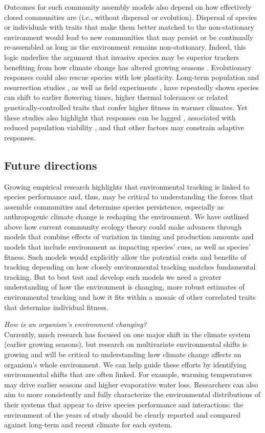\documentclass[11pt,letterpaper]{article}
\newcommand{\R}[1]{\label{#1}\linelabel{#1}}
\begin{document}
Outcomes for such community assembly models also depend on how effectively closed communities are  (i.e., without dispersal or evolution). Dispersal of species or individuals with traits that make them better matched to the non-stationary environment would lead to new communities that may persist or be continually re-assembled as long as the environment remains non-stationary. Indeed, this logic underlies the argument that invasive species may be superior trackers benefiting from how climate change has altered growing seasons \citep{Willis:2010al,wolkovich:2010fee}. Evolutionary responses could also rescue species with low plasticity. Long-term population \citep[e.g.,][]{colautti2017} and resurrection studies \citep{wilczek2014,yousey2018}, as well as field experiments \citep{colautti2017,arab2019}, have repeatedly shown species can shift to earlier flowering times, higher thermal tolerances or related genetically-controlled traits that confer higher fitness in warmer climates. Yet these studies also highlight that responses can be lagged \citep[e.g.,][]{wilczek2014}, associated with reduced population viability \citep[e.g.,][]{colautti2017}, and that other factors may constrain adaptive responses.

\subsection{Future directions}

Growing empirical research highlights that environmental tracking is linked to species performance and, thus, may be critical to understanding the forces that assemble communities and determine species persistence, especially as anthropogenic climate change is reshaping the environment. We have outlined above how  current community ecology theory could make advances through models that combine effects of variation in timing and production amounts and models that include environment as impacting species' cues, as well as species' fitness. Such models would explicitly allow the potential costs and benefits of tracking  depending on how closely environmental tracking matches fundamental tracking. But to best test and develop such models we need a greater understanding of how the environment is changing, more robust estimates of environmental tracking and how it fits within a mosaic of other correlated traits that determine individual fitness. 

\emph{How is an organism's environment changing?} \\ 
Currently, much research has focused on one major shift in the climate system (earlier growing seasons), but research on multivariate environmental shifts is growing and will be critical to understanding how climate change affects an organism's whole environment. We can help guide these efforts by identifying environmental shifts that are often linked. \R{r3misc5}For example, warming temperatures may drive earlier seasons and higher evaporative water loss. Researchers can also aim to more consistently and fully characterize the environmental distributions of their systems that appear to drive species performance and interactions: the environment of the years of study should be clearly reported and compared against long-term and recent climate for each system. 
\end{document}
